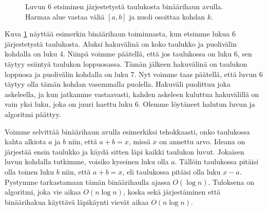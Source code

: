 \begin{figure}
\center
{}
\caption{Luvun 6 etsiminen järjestetystä taulukosta binäärihaun avulla.
Harmaa alue vastaa väliä $[a,b]$ ja nuoli osoittaa kohdan $k$.}
\label{fig:binhak}
\end{figure}

Kuva \ref{fig:binhak} näyttää esimerkin binäärihaun toiminnasta,
kun etsimme lukua 6 järjestetystä taulukosta.
Aluksi hakuvälinä on koko taulukko ja puolivälin kohdalla
on luku 4.
Niinpä voimme päätellä, että jos taulukossa on luku 6,
sen täytyy esiintyä taulukon loppuosassa.
Tämän jälkeen hakuvälinä on taulukon loppuosa ja
puolivälin kohdalla on luku 7.
Nyt voimme taas päätellä, että luvun 6 täytyy olla
tämän kohdan vasemmalla puolella.
Hakuväli puolittuu joka askeleella,
ja kun jatkamme vastaavasti, kahden askeleen kuluttua
hakuvälillä on vain yksi luku, joka on juuri haettu luku 6.
Olemme löytäneet halutun luvun ja algoritmi päättyy.

Voimme selvittää binäärihaun avulla esimerkiksi tehokkaasti,
onko taulukossa kahta alkiota $a$ ja $b$ niin,
että $a+b=x$, missä $x$ on annettu arvo.
Ideana on järjestää ensin taulukko ja käydä sitten läpi
kaikki taulukon luvut.
Jokaisen luvun kohdalla tutkimme, voisiko kyseinen luku olla $a$.
Tällöin taulukossa pitäisi olla toinen luku $b$ niin, että
$a+b=x$, eli taulukossa pitäisi olla luku $x-a$.
Pystymme tarkastamaan tämän binäärihaulla ajassa $O(\log n)$.
Tuloksena on algoritmi, joka vie aikaa $O(n \log n)$,
koska sekä järjestäminen että binäärihakua käyttävä läpikäynti
vievät aikaa $O(n \log n)$.
